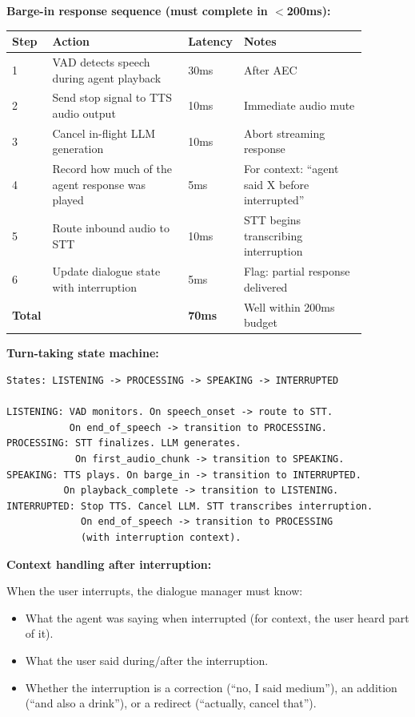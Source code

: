 \textbf{Barge-in response sequence (must complete in $<$200ms):}

\begin{tabular}{|p{0.04\linewidth}|p{0.4\linewidth}|p{0.08\linewidth}|p{0.36\linewidth}|}
\hline
\textbf{Step} & \textbf{Action} & \textbf{Latency} & \textbf{Notes} \\
\hline
1 & VAD detects speech during agent playback & 30ms & After AEC \\
\hline
2 & Send stop signal to TTS audio output & 10ms & Immediate audio mute \\
\hline
3 & Cancel in-flight LLM generation & 10ms & Abort streaming response \\
\hline
4 & Record how much of the agent response was played & 5ms & For context: ``agent said X before interrupted'' \\
\hline
5 & Route inbound audio to STT & 10ms & STT begins transcribing interruption \\
\hline
6 & Update dialogue state with interruption & 5ms & Flag: partial response delivered \\
\hline
\textbf{Total} & & \textbf{70ms} & Well within 200ms budget \\
\hline
\end{tabular}

\bigskip
\textbf{Turn-taking state machine:}

\begin{verbatim}
States: LISTENING -> PROCESSING -> SPEAKING -> INTERRUPTED

LISTENING: VAD monitors. On speech_onset -> route to STT.
           On end_of_speech -> transition to PROCESSING.
PROCESSING: STT finalizes. LLM generates.
            On first_audio_chunk -> transition to SPEAKING.
SPEAKING: TTS plays. On barge_in -> transition to INTERRUPTED.
          On playback_complete -> transition to LISTENING.
INTERRUPTED: Stop TTS. Cancel LLM. STT transcribes interruption.
             On end_of_speech -> transition to PROCESSING
             (with interruption context).
\end{verbatim}

\textbf{Context handling after interruption:}

When the user interrupts, the dialogue manager must know:
\begin{itemize}
  \item What the agent was saying when interrupted (for context, the user heard part of it).
  \item What the user said during/after the interruption.
  \item Whether the interruption is a correction (``no, I said medium''), an addition (``and also a drink''), or a redirect (``actually, cancel that'').
\end{itemize}


